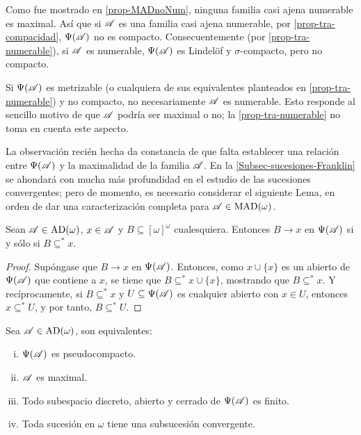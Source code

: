  Como fue mostrado en \ref{prop-MADnoNum}, ninguna familia casi ajena numerable es maximal. Así que si $\mathscr{A}$ es una familia casi ajena numerable, por \ref{prop-tra-compacidad}, $\Psi(\mathscr{A})$ no es compacto. Consecuentemente (por \ref{prop-tra-numerable}), si $\mathscr{A}$ es numerable, $\Psi(\mathscr{A})$ es Lindelöf y $\sigma$-compacto, pero no compacto.
 
 \begin{observacion}
  Si $\Psi(\mathscr{A})$ es metrizable (o cualquiera de sus equivalentes planteados en \ref{prop-tra-numerable}) y no compacto, no necesariamente $\mathscr{A}$ es numerable. Esto responde al sencillo motivo de que $\mathscr{A}$ podría ser maximal o no; la \autoref{prop-tra-numerable} no toma en cuenta este aspecto.
 \end{observacion}

 La observación recién hecha da constancia de que falta establecer una relación entre $\Psi(\mathscr{A})$ y la maximalidad de la familia $\mathscr{A}$. En la \autoref{Subsec-sucesiones-Franklin} se ahondará con mucha más profundidad en el estudio de las sucesiones convergentes; pero de momento, es necesario considerar el siguiente Lema, en orden de dar una caracterización completa para $\mathscr{A} \in \operatorname{MAD}(\omega)$.
 
 \begin{lema}\label{lem-convObvia}
  Sean $\mathscr{A} \in \operatorname{AD}(\omega) $, $x \in \mathscr{A}$ y $B \subseteq [\omega]^\omega$ cualesquiera. Entonces $B \to x$ en $\Psi(\mathscr{A})$ si y sólo si $B \subseteq ^* x$.
 \end{lema}

 \begin{proof} 
  Supóngase que $B \to x$ en $\Psi(\mathscr{A})$. Entonces, como $x \cup \{x\}$ es un abierto de $\Psi(\mathscr{A})$ que contiene a $x$, se tiene que $B \subseteq^* x \cup \{x\}$, mostrando que $B \subseteq^* x$. Y recíprocamente, si $B \subseteq^* x$ y $U \subseteq \Psi(\mathscr{A})$ es cualquier abierto con $x \in U$, entonces $x \subseteq^* U$, y por tanto, $B \subseteq^* U$.
 \end{proof}
 
 \begin{proposicion}\label{prop-tra-pseudoCaract}
  Sea $\mathscr{A} \in \operatorname{AD}(\omega)$, son equivalentes:
  \begin{enumerate}[i)]
   \item $\Psi(\mathscr{A})$ es pseudocompacto.
   \item $\mathscr{A}$ es maximal.
   \item Todo subespacio discreto, abierto y cerrado de $\Psi(\mathscr{A})$ es finito.
   \item Toda sucesión en $\omega$ tiene una subsucesión convergente.
  \end{enumerate}
 \end{proposicion}
 
